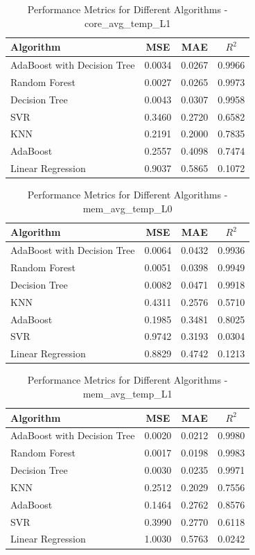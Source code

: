 \documentclass[conference]{IEEEtran}
\begin{document}
\begin{table}[htbp]
	\caption{Performance Metrics for Different Algorithms - core\_avg\_temp\_L1}
	\label{tab:core_avg_temp_L1}
	\begin{tabular}{lccc}
		\toprule
		\textbf{Algorithm} & \textbf{MSE} & \textbf{MAE} & \textbf{\(R^2\)} \\
		\midrule
		AdaBoost with Decision Tree & 0.0034 & 0.0267 & 0.9966 \\
		Random Forest & 0.0027 & 0.0265 & 0.9973 \\
		Decision Tree & 0.0043 & 0.0307 & 0.9958 \\
		SVR & 0.3460 & 0.2720 & 0.6582 \\
		KNN & 0.2191 & 0.2000 & 0.7835 \\
		AdaBoost & 0.2557 & 0.4098 & 0.7474 \\
		Linear Regression & 0.9037 & 0.5865 & 0.1072 \\
		\bottomrule
	\end{tabular}
\end{table}
\begin{table}[htbp]
	\caption{Performance Metrics for Different Algorithms - mem\_avg\_temp\_L0}
	\label{tab:mem_avg_temp_L0}
	\begin{tabular}{lccc}
		\toprule
		\textbf{Algorithm} & \textbf{MSE} & \textbf{MAE} & \textbf{\(R^2\)} \\
		\midrule
		AdaBoost with Decision Tree & 0.0064 & 0.0432 & 0.9936 \\
		Random Forest & 0.0051 & 0.0398 & 0.9949 \\
		Decision Tree & 0.0082 & 0.0471 & 0.9918 \\
		KNN & 0.4311 & 0.2576 & 0.5710 \\
		AdaBoost & 0.1985 & 0.3481 & 0.8025 \\
		SVR & 0.9742 & 0.3193 & 0.0304 \\
		Linear Regression & 0.8829 & 0.4742 & 0.1213 \\
		\bottomrule
	\end{tabular}
\end{table}
\begin{table}[htbp]
	\caption{Performance Metrics for Different Algorithms - mem\_avg\_temp\_L1}
	\label{tab:mem_avg_temp_L1}
	\begin{tabular}{lccc}
		\toprule
		\textbf{Algorithm} & \textbf{MSE} & \textbf{MAE} & \textbf{\(R^2\)} \\
		\midrule
		AdaBoost with Decision Tree & 0.0020 & 0.0212 & 0.9980 \\
		Random Forest & 0.0017 & 0.0198 & 0.9983 \\
		Decision Tree & 0.0030 & 0.0235 & 0.9971 \\
		KNN & 0.2512 & 0.2029 & 0.7556 \\
		AdaBoost & 0.1464 & 0.2762 & 0.8576 \\
		SVR & 0.3990 & 0.2770 & 0.6118 \\
		Linear Regression & 1.0030 & 0.5763 & 0.0242 \\
		\bottomrule
	\end{tabular}
\end{table}
\end{document}
